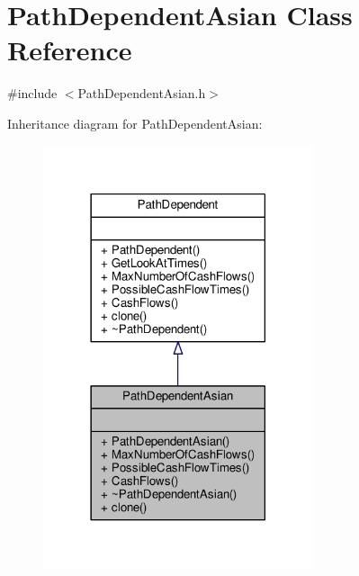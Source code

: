 \hypertarget{classPathDependentAsian}{}\section{Path\+Dependent\+Asian Class Reference}
\label{classPathDependentAsian}


{\ttfamily \#include $<$Path\+Dependent\+Asian.\+h$>$}



Inheritance diagram for Path\+Dependent\+Asian\+:
\nopagebreak
\begin{figure}[H]
\begin{center}
\leavevmode
\includegraphics[width=225pt]{classPathDependentAsian__inherit__graph}
\end{center}
\end{figure}


